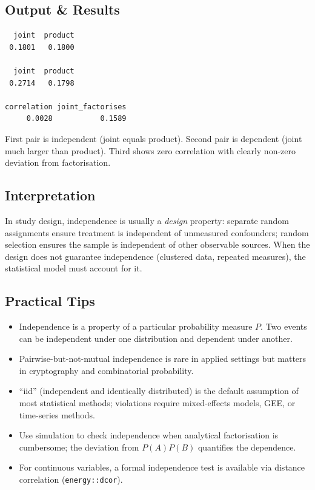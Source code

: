 \documentclass[
]{article}
\providecommand{\tightlist}{%
  \setlength{\itemsep}{0pt}\setlength{\parskip}{0pt}}
\begin{document}
\subsection{Output \& Results}\label{output-results}

\begin{verbatim}
  joint  product
 0.1801   0.1800

  joint  product
 0.2714   0.1798

correlation joint_factorises
     0.0028           0.1589
\end{verbatim}

First pair is independent (joint equals product). Second pair is
dependent (joint much larger than product). Third shows zero correlation
with clearly non-zero deviation from factorisation.

\subsection{Interpretation}\label{interpretation}

In study design, independence is usually a \emph{design} property:
separate random assignments ensure treatment is independent of
unmeasured confounders; random selection ensures the sample is
independent of other observable sources. When the design does not
guarantee independence (clustered data, repeated measures), the
statistical model must account for it.

\subsection{Practical Tips}\label{practical-tips}

\begin{itemize}
\tightlist
\item
  Independence is a property of a particular probability measure \(P\).
  Two events can be independent under one distribution and dependent
  under another.
\item
  Pairwise-but-not-mutual independence is rare in applied settings but
  matters in cryptography and combinatorial probability.
\item
  ``iid'' (independent and identically distributed) is the default
  assumption of most statistical methods; violations require
  mixed-effects models, GEE, or time-series methods.
\item
  Use simulation to check independence when analytical factorisation is
  cumbersome; the deviation from \(P(A)P(B)\) quantifies the dependence.
\item
  For continuous variables, a formal independence test is available via
  distance correlation (\texttt{energy::dcor}).
\end{itemize}
\end{document}
